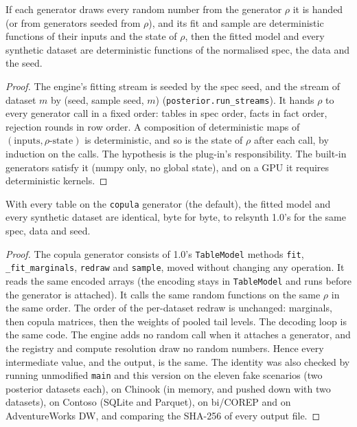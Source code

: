 \begin{proposition}\label{prop:genseed}
If each generator draws every random number from the generator $\rho$ it is handed (or from generators seeded from
$\rho$), and its fit and sample are deterministic functions of their inputs and the state of $\rho$, then the fitted
model and every synthetic dataset are deterministic functions of the normalised spec, the data and the seed.
\end{proposition}
\begin{proof}
The engine's fitting stream is seeded by the spec seed, and the stream of dataset $m$ by (seed, sample seed, $m$)
(\texttt{posterior.run\_streams}). It hands $\rho$ to every generator call in a fixed order: tables in spec order,
facts in fact order, rejection rounds in row order. A composition of deterministic maps of
$(\text{inputs},\rho\text{-state})$ is deterministic, and so is the state of $\rho$ after each call, by induction on
the calls. The hypothesis is the plug-in's responsibility. The built-in generators satisfy it (numpy only, no global
state), and on a GPU it requires deterministic kernels.
\end{proof}

\begin{proposition}\label{prop:gencopula}
With every table on the \texttt{copula} generator (the default), the fitted model and every synthetic dataset are
identical, byte for byte, to relsynth 1.0's for the same spec, data and seed.
\end{proposition}
\begin{proof}
The copula generator consists of 1.0's \texttt{TableModel} methods \texttt{fit}, \texttt{\_fit\_marginals},
\texttt{redraw} and \texttt{sample}, moved without changing any operation. It reads the same encoded arrays (the
encoding stays in \texttt{TableModel} and runs before the generator is attached). It calls the same random
functions on the same $\rho$ in the same order. The order of the per-dataset redraw is unchanged: marginals, then
copula matrices, then the weights of pooled tail levels. The decoding loop is the same code. The engine adds no
random call when it attaches a generator, and the registry and compute resolution draw no random numbers. Hence
every intermediate value, and the output, is the same. The identity was also checked by running unmodified
\texttt{main} and this version on the eleven fake scenarios (two posterior datasets each), on Chinook (in memory, and
pushed down with two datasets), on Contoso (SQLite and Parquet), on bi/COREP and on AdventureWorks DW, and comparing
the SHA-256 of every output file.
\end{proof}

